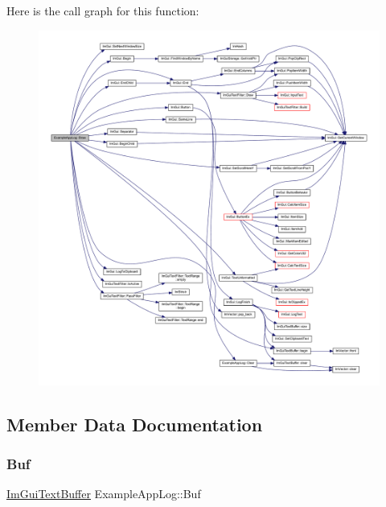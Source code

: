Here is the call graph for this function\+:
\nopagebreak
\begin{figure}[H]
\begin{center}
\leavevmode
\includegraphics[width=350pt]{struct_example_app_log_a5ad3a4bdb89171b84aeaff96948a1f77_cgraph}
\end{center}
\end{figure}


\subsection{Member Data Documentation}
\mbox{\label{struct_example_app_log_a74fb7cd7bd8c2507b41331ebb7d0e56d}} 
\subsubsection{\texorpdfstring{Buf}{Buf}}
{\footnotesize\ttfamily \mbox{\hyperlink{struct_im_gui_text_buffer}{Im\+Gui\+Text\+Buffer}} Example\+App\+Log\+::\+Buf}

\mbox{\label{struct_example_app_log_a4571947a6000e984ec8da9b7166e1e2b}} 

